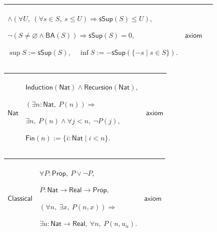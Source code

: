 \documentclass[11pt]{amsart}
\newlength{\FTCThreeColumnBody}
\begin{document}
{\begin{tabular}{|@{}>{\centering\arraybackslash}m{0.251968\FTCThreeColumnBody}|>{\centering\arraybackslash}m{0.590551\FTCThreeColumnBody}|>{\centering\arraybackslash}m{0.157480\FTCThreeColumnBody}|}
$\displaystyle \land(\forall U,\ (\forall s\in S,\ s\le U)\Rightarrow\textsf{sSup}(S)\le U),$\par
$\displaystyle \neg(S\ne\varnothing\land\textsf{BA}(S))\Rightarrow\textsf{sSup}(S)=0,$\par
$\displaystyle \sup S:=\textsf{sSup}(S),\quad\inf S:=-\textsf{sSup}(\{-s\mid s\in S\}).$ & $\displaystyle \textsf{axiom}$\\ \hline
\end{tabular}%
\par\setlength{\parskip}{0pt}\nointerlineskip
\noindent
\begin{tabular}{|@{}>{\centering\arraybackslash}m{0.251968\FTCThreeColumnBody}|>{\centering\arraybackslash}m{0.590551\FTCThreeColumnBody}|>{\centering\arraybackslash}m{0.157480\FTCThreeColumnBody}|}\hline
\hypertarget{ax:Nat}{$\displaystyle \textsf{Nat}$} & $\displaystyle \textsf{Induction}(\textsf{Nat})\land\textsf{Recursion}(\textsf{Nat}),$\par
$\displaystyle (\exists n:\textsf{Nat},\ P(n))\Rightarrow$\par
$\displaystyle \exists n,\ P(n)\land\forall j<n,\ \neg P(j),$\par
$\displaystyle \textsf{Fin}(n):=\{i:\textsf{Nat}\mid i<n\}.$ & $\displaystyle \textsf{axiom}$\\ \hline
\end{tabular}%
\par\setlength{\parskip}{0pt}\nointerlineskip
\noindent
\begin{tabular}{|@{}>{\centering\arraybackslash}m{0.251968\FTCThreeColumnBody}|>{\centering\arraybackslash}m{0.590551\FTCThreeColumnBody}|>{\centering\arraybackslash}m{0.157480\FTCThreeColumnBody}|}\hline
\hypertarget{ax:Classical}{$\displaystyle \textsf{Classical}$} & $\displaystyle \forall P:\textsf{Prop},\ P\lor\neg P,$\par
$\displaystyle P:\textsf{Nat}\to\textsf{Real}\to\textsf{Prop},$\par
$\displaystyle (\forall n,\ \exists x,\ P(n,x))\Rightarrow$\par
$\displaystyle \exists u:\textsf{Nat}\to\textsf{Real},\ \forall n,\ P(n,u_n).$ & $\displaystyle \textsf{axiom}$\\ \hline
\end{tabular}%
\par
}
\end{document}
